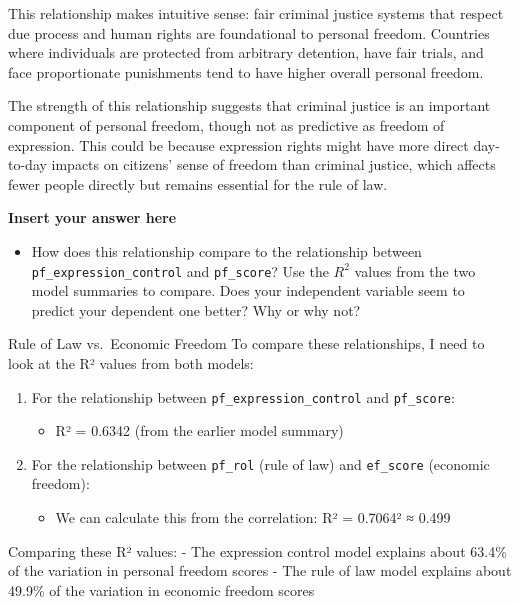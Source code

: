 \documentclass[
]{article}
\providecommand{\tightlist}{%
  \setlength{\itemsep}{0pt}\setlength{\parskip}{0pt}}
\begin{document}
This relationship makes intuitive sense: fair criminal justice systems
that respect due process and human rights are foundational to personal
freedom. Countries where individuals are protected from arbitrary
detention, have fair trials, and face proportionate punishments tend to
have higher overall personal freedom.

The strength of this relationship suggests that criminal justice is an
important component of personal freedom, though not as predictive as
freedom of expression. This could be because expression rights might
have more direct day-to-day impacts on citizens' sense of freedom than
criminal justice, which affects fewer people directly but remains
essential for the rule of law.

\textbf{Insert your answer here}

\begin{itemize}
\tightlist
\item
  How does this relationship compare to the relationship between
  \texttt{pf\_expression\_control} and \texttt{pf\_score}? Use the
  \(R^2\) values from the two model summaries to compare. Does your
  independent variable seem to predict your dependent one better? Why or
  why not?
\end{itemize}

Rule of Law vs.~Economic Freedom To compare these relationships, I need
to look at the R² values from both models:

\begin{enumerate}
\def\labelenumi{\arabic{enumi}.}
\tightlist
\item
  For the relationship between \texttt{pf\_expression\_control} and
  \texttt{pf\_score}:

  \begin{itemize}
  \tightlist
  \item
    R² = 0.6342 (from the earlier model summary)
  \end{itemize}
\item
  For the relationship between \texttt{pf\_rol} (rule of law) and
  \texttt{ef\_score} (economic freedom):

  \begin{itemize}
  \tightlist
  \item
    We can calculate this from the correlation: R² = 0.7064² ≈ 0.499
  \end{itemize}
\end{enumerate}

Comparing these R² values: - The expression control model explains about
63.4\% of the variation in personal freedom scores - The rule of law
model explains about 49.9\% of the variation in economic freedom scores
\end{document}
